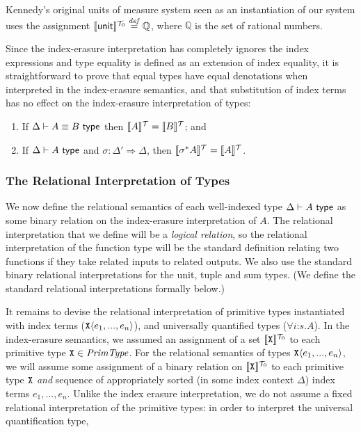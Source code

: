 \begin{example} Kennedy's original units of measure
  system seen as an instantiation of our system uses the assignment
  $\llbracket \mathsf{unit} \rrbracket^{\mathcal{T}_0} \stackrel{\mathit{def}}= \mathbb{Q}$, where
  $\mathbb{Q}$ is the set of rational numbers.
\end{example}

Since the index-erasure interpretation has completely ignores the
index expressions and type equality is defined as an extension of
index equality, it is straightforward to prove that equal types have
equal denotations when interpreted in the index-erasure semantics, and
that substitution of index terms has no effect on the index-erasure
interpretation of types:
\begin{lemma}\label{lem:tyeqsubst-erasure}
  \begin{enumerate}
  \item If $\Delta \vdash A \equiv B \textsf{ type}$ then $\llbracket A \rrbracket^{\mathcal{T}} =
    \llbracket B \rrbracket^{\mathcal{T}}$; and
  \item If $\Delta \vdash A \textsf{ type}$ and $\sigma : \Delta' \Rightarrow
    \Delta$, then $\llbracket \sigma^*A \rrbracket^{\mathcal{T}} = \llbracket A \rrbracket^{\mathcal{T}}$.
  \end{enumerate}
\end{lemma}

\subsubsection{The Relational Interpretation of Types}
\label{sec:relational-semantics}

We now define the relational semantics of each well-indexed type
$\Delta \vdash A \textsf{ type}$ as some binary relation on the index-erasure
interpretation of $A$. The relational interpretation that we define
will be a \emph{logical relation}, so the relational interpretation of
the function type will be the standard definition relating two
functions if they take related inputs to related outputs. We also use
the standard binary relational interpretations for the unit, tuple and
sum types. (We define the standard relational interpretations formally
below.)

It remains to devise the relational interpretation of primitive types
instantiated with index terms ($\texttt{X}\langle e_1,...,e_n \rangle$), and
universally quantified types ($\forall i\mathord:s. A$). In the
index-erasure semantics, we assumed an assignment of a set
$\llbracket \texttt{X} \rrbracket^{\mathcal{T}_0}$ to each primitive type $\texttt{X} \in
\mathit{PrimType}$. For the relational semantics of types
$\texttt{X}\langle e_1,...,e_n \rangle$, we will assume some assignment of a binary
relation on $\llbracket \texttt{X} \rrbracket^{\mathcal{T}_0}$ to each primitive type
$\texttt{X}$ \emph{and} sequence of appropriately sorted (in some
index context $\Delta$) index terms $e_1,...,e_n$. Unlike the index
erasure interpretation, we do not assume a fixed relational
interpretation of the primitive types: in order to interpret the
universal quantification type, 

